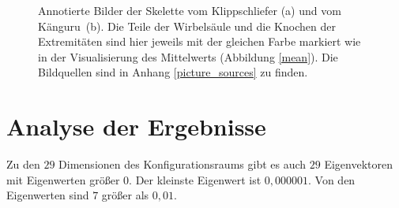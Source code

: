  \begin{figure}
  \qquad
  
  \caption{Annotierte Bilder der Skelette vom Klippschliefer (a) und vom \mbox{Känguru (b)}. Die Teile der Wirbelsäule und die Knochen der Extremitäten sind hier jeweils mit der gleichen Farbe markiert wie in der Visualisierung des Mittelwerts (Abbildung \ref{mean}). Die Bildquellen sind in Anhang \ref{picture_sources} zu finden.}
 \end{figure}
 

 \section{Analyse der Ergebnisse}
 \label{section_pca_result_analysis}
 
 Zu den $29$ Dimensionen des Konfigurationsraums gibt es auch $29$ Eigenvektoren mit Eigenwerten größer $0$. Der kleinste Eigenwert ist $0{,}000001$. Von den Eigenwerten sind $7$ größer als $0{,}01$. 
 
